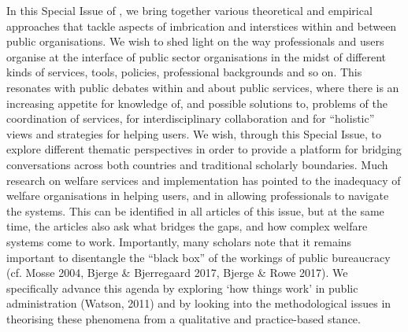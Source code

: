 \par
In this Special Issue of \textit{\theJournal}, we bring together various theoretical and empirical approaches that tackle aspects of imbrication and interstices within and between public organisations. We wish to shed light on the way professionals and users organise at the interface of public sector organisations in the midst of different kinds of services, tools, policies, professional backgrounds and so on. This resonates with public debates within and about public services, where there is an increasing appetite for knowledge of, and possible solutions to, problems of the coordination of services, for interdisciplinary collaboration and for “holistic” views and strategies for helping users. We wish, through this Special Issue, to explore different thematic perspectives in order to provide a platform for bridging conversations across both countries and traditional scholarly boundaries. Much research on welfare services and implementation has pointed to the inadequacy of welfare organisations in helping users, and in allowing professionals to navigate the systems. This can be identified in all articles of this issue, but at the same time, the articles also ask what bridges the gaps, and how complex welfare systems come to work. Importantly, many scholars note that it remains important to disentangle the “black box” of the workings of public bureaucracy (cf. Mosse 2004, Bjerge \& Bjerregaard 2017, Bjerge \& Rowe 2017). We specifically advance this agenda by exploring ‘how things work’ in public administration (Watson, 2011) and by looking into the methodological issues in theorising these phenomena from a qualitative and practice-based stance.\pagebreak

